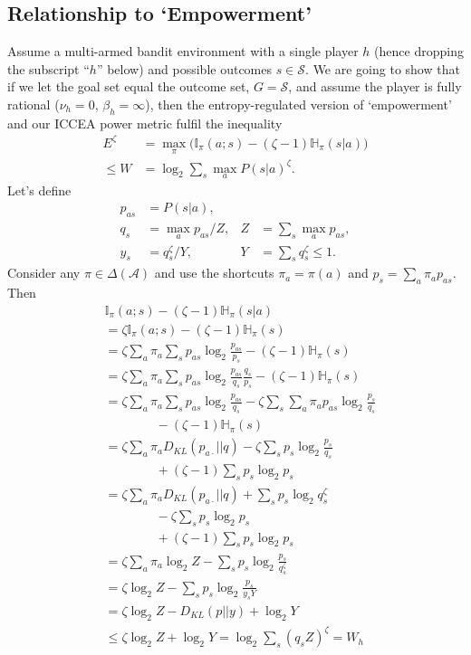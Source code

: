 \documentclass[letterpaper]{article} %
\def\A{\mathcal{A}}
\def\S{\mathcal{S}}
\def\ld{\log_2}
\def\entropy{\mathbb{H}} %
\def\MI{\mathbb{I}} %
\def\DKL{D_{KL}} %
\begin{document}
\subsection*{Relationship to `Empowerment'}
Assume a  multi-armed bandit environment with a single player $h$ (hence dropping the subscript ``$h$'' below)
and possible outcomes $s\in\S$.
We are going to show that if we let the goal set equal the outcome set, $G=\S$, 
and assume the player is fully rational ($\nu_h=0$, $\beta_h=\infty$),
then the entropy-regulated version of `empowerment' and our ICCEA power metric fulfil the inequality
\begin{align*}
    E^\zeta &= \max_\pi \big(\MI_\pi(a;s) - (\zeta-1)\entropy_\pi(s|a)\big) \\
    \le W &= \ld \sum_s \max_a P(s|a)^\zeta.
\end{align*}
Let's define 
\begin{align*}
    p_{as} &= P(s|a), \\
    q_s &= \max_a p_{as} / Z, & 
    Z &= \sum_s \max_{a} p_{as}, \\
    y_s &= q_s^\zeta / Y, & 
    Y &= \sum_s q_s^\zeta \le 1.
\end{align*}
Consider any $\pi\in\Delta(\A)$ and use the shortcuts $\pi_a=\pi(a)$ and $p_s = \sum_a \pi_a p_{as}$.
Then
\begin{align*}
    &\MI_\pi(a;s) - (\zeta-1)\entropy_\pi(s|a) \\
    &= \zeta\MI_\pi(a;s) - (\zeta-1)\entropy_\pi(s) \\
    &= \zeta\sum_a \pi_a \sum_s p_{as} \ld\frac{p_{as}}{p_s} - (\zeta-1)\entropy_\pi(s) \\
    &= \zeta\sum_a \pi_a \sum_s p_{as} \ld\frac{p_{as}}{q_s}\frac{q_s}{p_s} - (\zeta-1)\entropy_\pi(s)\\
    &= \zeta\sum_a \pi_a \sum_s p_{as} \ld\frac{p_{as}}{q_s} - \zeta\sum_s \sum_a \pi_a p_{as} \ld\frac{p_s}{q_s} \\
    &\qquad\qquad - (\zeta-1)\entropy_\pi(s) \\
    &= \zeta\sum_a \pi_a \DKL(p_{a\cdot} || q) - \zeta\sum_s p_s \ld\frac{p_s}{q_s} \\
    &\qquad\qquad  + (\zeta-1)\sum_s p_s\ld p_s \\
    &= \zeta\sum_a \pi_a \DKL(p_{a\cdot} || q) + \sum_s p_s \ld q_s^\zeta \\
    &\qquad\qquad - \zeta\sum_s p_s \ld p_s \\
    &\qquad\qquad  + (\zeta-1)\sum_s p_s\ld p_s \\
    &= \zeta\sum_a \pi_a \ld Z - \sum_s p_s \ld\frac{p_s}{q_s^\zeta} \\
    &= \zeta\ld Z - \sum_s p_s \ld\frac{p_s}{y_s Y} \\
    &= \zeta\ld Z - \DKL(p||y) + \ld Y \\
    &\le \zeta\ld Z + \ld Y = \ld\sum_s (q_s Z)^\zeta = W_h
\end{align*}
\end{document}
